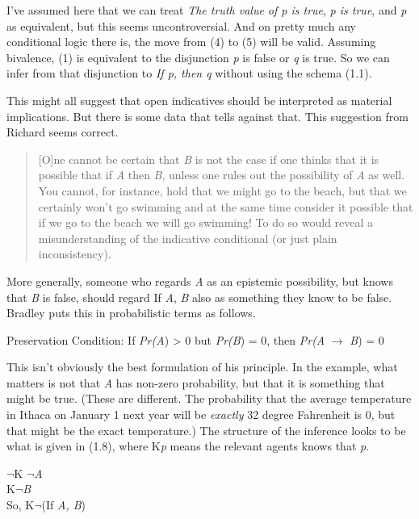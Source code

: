 \noindent I've assumed here that we can treat \textit{The truth value of p is true}, \textit{p is true}, and \textit{p} as equivalent, but this seems uncontroversial. And on pretty much any conditional logic there is, the move from (4) to (5) will be valid. Assuming bivalence, (1) is equivalent to the disjunction \textit{p} is false or \textit{q} is true. So we can infer from that disjunction to \textit{If p, then q} without using the schema (1.1). 

This might all suggest that open indicatives should be interpreted as material implications. But there is some data that tells against that. This suggestion from Richard \cite{Bradley2000} seems correct.

\begin{quote}
[O]ne cannot be certain that \textit{B} is not the case if one thinks that it is possible that if \textit{A} then \textit{B}, unless one rules out the possibility of \textit{A} as well. You cannot, for instance, hold that we might go to the beach, but that we certainly won't go swimming and at the same time consider it possible that if we go to the beach we will go swimming! To do so would reveal a misunderstanding of the indicative conditional (or just plain inconsistency). \cite[220]{Bradley2000}
\end{quote}

More generally, someone who regards \textit{A} as an epistemic possibility, but knows that \textit{B} is false, should regard If \textit{A}, \textit{B} also as something they know to be false. Bradley puts this in probabilistic terms as follows.

\begin{description*}
\item[Preservation Condition:] If \textit{Pr(A}) > 0 but \textit{Pr(B}) = 0, then \textit{Pr(A} \(\rightarrow\) \textit{B}) = 0
\end{description*}

\noindent This isn't obviously the best formulation of his principle. In the example, what matters is not that \textit{A} has non-zero probability, but that it is something that might be true. (These are different. The probability that the average temperature in Ithaca on January 1 next year will be \textit{exactly }32 degree Fahrenheit is 0, but that might be the exact temperature.) The structure of the inference looks to be what is given in (1.8), where K\textit{p} means the relevant agents knows that \textit{p}.

\renewcommand{\labelenumi}{(1.\arabic{enumi})}
\begin{enumerate*}
\setcounter{enumi}{7}
\item  \(\neg\){}K \(\neg\){}\textit{A} \\
K\(\neg\){}\textit{B} \\
So, K\(\neg\){}(If\textit{ A, B})
\end{enumerate*}

